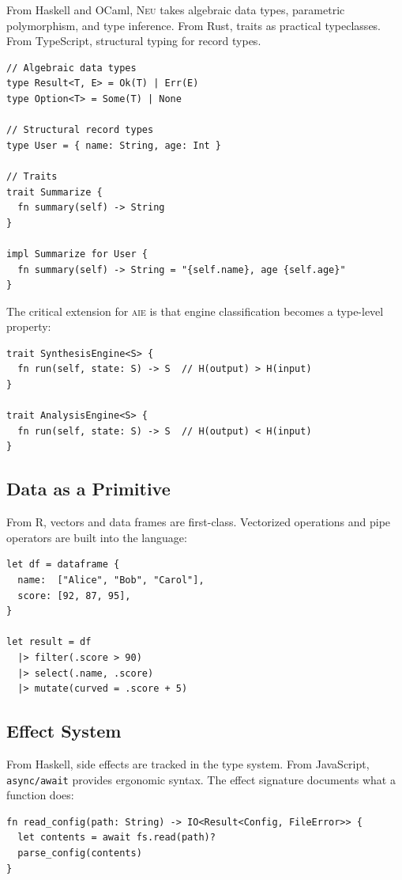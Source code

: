 \documentclass[11pt,letterpaper]{article}
\newcommand{\neu}{\textsc{Neu}}
\newcommand{\aie}{\textsc{aie}}
\begin{document}
From Haskell and OCaml, \neu{} takes algebraic data types, parametric polymorphism, and type inference. From Rust, traits as practical typeclasses. From TypeScript, structural typing for record types.

\begin{lstlisting}
// Algebraic data types
type Result<T, E> = Ok(T) | Err(E)
type Option<T> = Some(T) | None

// Structural record types
type User = { name: String, age: Int }

// Traits
trait Summarize {
  fn summary(self) -> String
}

impl Summarize for User {
  fn summary(self) -> String = "{self.name}, age {self.age}"
}
\end{lstlisting}

The critical extension for \aie{} is that engine classification becomes a type-level property:

\begin{lstlisting}
trait SynthesisEngine<S> {
  fn run(self, state: S) -> S  // H(output) > H(input)
}

trait AnalysisEngine<S> {
  fn run(self, state: S) -> S  // H(output) < H(input)
}
\end{lstlisting}

\subsection{Data as a Primitive}

From R, vectors and data frames are first-class. Vectorized operations and pipe operators are built into the language:

\begin{lstlisting}
let df = dataframe {
  name:  ["Alice", "Bob", "Carol"],
  score: [92, 87, 95],
}

let result = df
  |> filter(.score > 90)
  |> select(.name, .score)
  |> mutate(curved = .score + 5)
\end{lstlisting}

\subsection{Effect System}

From Haskell, side effects are tracked in the type system. From JavaScript, \texttt{async/await} provides ergonomic syntax. The effect signature documents what a function does:

\begin{lstlisting}
fn read_config(path: String) -> IO<Result<Config, FileError>> {
  let contents = await fs.read(path)?
  parse_config(contents)
}
\end{lstlisting}
\end{document}
